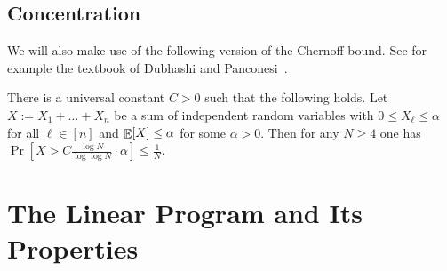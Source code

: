   
  
  \subsection{Concentration}
  We will also make use of the following version of the Chernoff bound. See for example the textbook of Dubhashi and Panconesi~\cite{ConcentrationOfMeasure-DubhashiPanconesi-Book2009}.
  \begin{lemma} \label{lem:ChernoffBound}
    There is a universal constant $C>0$ such that the following holds. 
    Let $X := X_1 + \ldots + X_n$ be a sum of independent random variables with $0 \leq X_{\ell} \leq \alpha$ for all $\ell \in [n]$
    and $\mathop{\mathbb{E}}[X] \leq \alpha$ for some $\alpha>0$. Then for any $N \geq 4$ one has $\Pr[X > C\frac{\log N}{\log \log N} \cdot \alpha] \leq \frac{1}{N}$.
  \end{lemma}
  
  
  \section{The Linear Program and Its Properties}
  \label{sec:lp_and_properties}
  
